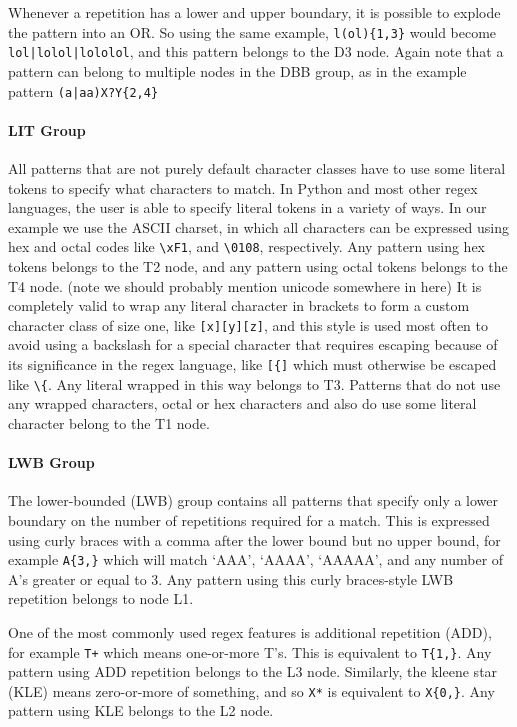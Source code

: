 Whenever a repetition has a lower and upper boundary, it is possible to explode the pattern into an OR.  So using the same example, \verb!l(ol){1,3}! would become \verb!lol|lolol|lololol!, and this pattern belongs to the D3 node.  Again note that a pattern can belong to multiple nodes in the DBB group, as in the example pattern \verb!(a|aa)X?Y{2,4}!
\paragraph{LIT Group}
All patterns that are not purely default character classes have to use some literal tokens to specify what characters to match.  In Python and most other regex languages, the user is able to specify literal tokens in a variety of ways.  In our example we use the ASCII charset, in which all characters can be expressed using hex and octal codes like \verb!\xF1!, and \verb!\0108!, respectively.  Any pattern using hex tokens belongs to the T2 node, and any pattern using octal tokens belongs to the T4 node.  (note we should probably mention unicode somewhere in here)  It is completely valid to wrap any literal character in brackets to form a custom character class of size one, like \verb![x][y][z]!, and this style is used most often to avoid using a backslash for a special character that requires escaping because of its significance in the regex language, like \verb![{]! which must otherwise be escaped like \verb!\{!.  Any literal wrapped in this way belongs to T3.
Patterns that do not use any wrapped characters, octal or hex characters and also do use some literal character belong to the T1 node.


\paragraph{LWB Group}
The lower-bounded (LWB) group contains all patterns that specify only a lower boundary on the number of repetitions required for a match.  This is expressed using curly braces with a comma after the lower bound but no upper bound, for example \verb!A{3,}! which will match `AAA', `AAAA', `AAAAA', and any number of A's greater or equal to 3.  Any pattern using this curly braces-style LWB repetition belongs to node L1.

One of the most commonly used regex features is additional repetition (ADD), for example \verb!T+! which means one-or-more T's.  This is equivalent to \verb!T{1,}!.  Any pattern using ADD repetition belongs to the L3 node.  Similarly, the kleene star (KLE) means zero-or-more of something, and so \verb!X*! is equivalent to \verb!X{0,}!.  Any pattern using KLE belongs to the L2 node.

